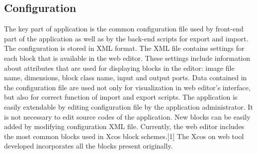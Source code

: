 \documentclass[conference]{IEEEtran}
\begin{document}
\subsection{Configuration}
The key part of application is the common configuration file
used by front-end part of the application as well as by the
back-end scripts for export and import. The configuration is
stored in XML format. The XML file contains settings for
each block that is available in the web editor. These settings
include information about attributes that are used for
displaying blocks in the editor: image file name, dimensions,
block class name, input and output ports.
Data contained in the configuration file are used not only for
visualization in web editor’s interface, but also for correct
function of import and export scripts.
The application is easily extendable by editing configuration
file by the application administrator. It is not necessary to edit
source codes of the application. New blocks can be easily
added by modifying configuration XML file. Currently, the
web editor includes the most common blocks used in Xcos
block schemes.[1] The Xcos on web tool developed incorporates all the blocks present originally.
\end{document}
